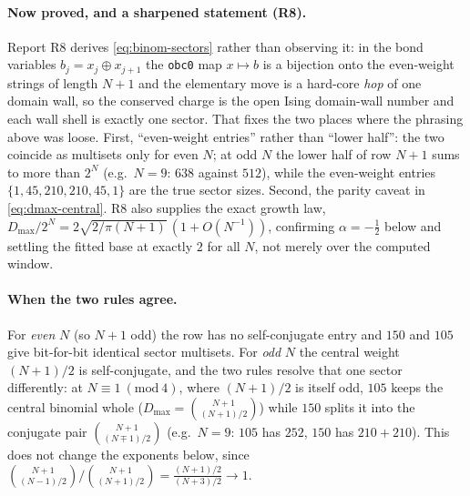 \documentclass[11pt]{article}
\newcommand{\rt}[1]{\texttt{#1}}
\begin{document}
\paragraph{Now proved, and a sharpened statement (R8).} Report R8 derives
\eqref{eq:binom-sectors} rather than observing it: in the bond variables
$b_j=x_j\oplus x_{j+1}$ the \rt{obc0} map $x\mapsto b$ is a bijection onto the
even-weight strings of length $N+1$ and the elementary move is a hard-core
\emph{hop} of one domain wall, so the conserved charge is the open Ising
domain-wall number and each wall shell is exactly one sector. That fixes the two
places where the phrasing above was loose. First, ``even-weight entries'' rather
than ``lower half'': the two coincide as multisets only for even $N$; at odd $N$
the lower half of row $N+1$ sums to more than $2^N$ (e.g.\ $N=9$: $638$ against
$512$), while the even-weight entries $\{1,45,210,210,45,1\}$ are the true sector
sizes. Second, the parity caveat in \eqref{eq:dmax-central}. R8 also supplies the
exact growth law, $D_{\max}/2^N = 2\sqrt{2/\pi(N+1)}\,(1+O(N^{-1}))$, confirming
$\alpha=-\tfrac12$ below and settling the fitted base at exactly $2$ for all $N$,
not merely over the computed window.

\paragraph{When the two rules agree.} For \emph{even} $N$ (so $N+1$ odd) the row
has no self-conjugate entry and $150$ and $105$ give bit-for-bit identical sector
multisets. For \emph{odd} $N$ the central weight $(N{+}1)/2$ is self-conjugate,
and the two rules resolve that one sector differently: at $N\equiv1\ (\mathrm{mod}\ 4)$,
where $(N{+}1)/2$ is itself odd, $105$ keeps the central binomial whole
($D_{\max}=\binom{N+1}{(N+1)/2}$) while $150$ splits it into the conjugate pair
$\binom{N+1}{(N\mp1)/2}$ (e.g.\ $N=9$: $105$ has $252$, $150$ has $210+210$).
This does not change the exponents below, since
$\binom{N+1}{(N-1)/2}\big/\binom{N+1}{(N+1)/2}=\tfrac{(N+1)/2}{(N+3)/2}\to1$.
\end{document}
